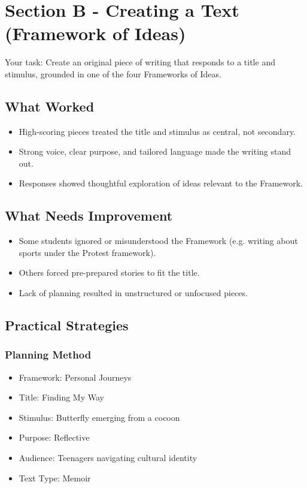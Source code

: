 \documentclass[a4paper]{article}
\begin{document}
\newpage
\section{Section B - Creating a Text (Framework of Ideas)}
Your task: Create an original piece of writing that responds to a title and stimulus, grounded in one of the four Frameworks of Ideas.

\subsection{What Worked}
\begin{itemize}
    \item High-scoring pieces treated the title and stimulus as central, not secondary.

\item Strong voice, clear purpose, and tailored language made the writing stand out.

\item Responses showed thoughtful exploration of ideas relevant to the Framework.
\end{itemize}

\subsection{What Needs Improvement}
\begin{itemize}
    \item Some students ignored or misunderstood the Framework (e.g. writing about sports under the Protest framework).

\item Others forced pre-prepared stories to fit the title.

\item Lack of planning resulted in unstructured or unfocused pieces.
\end{itemize}

\subsection{Practical Strategies}
\subsubsection{Planning Method}
\begin{itemize}
    \item Framework: Personal Journeys

\item Title: Finding My Way

\item Stimulus: Butterfly emerging from a cocoon

\item Purpose: Reflective

\item Audience: Teenagers navigating cultural identity

\item Text Type: Memoir
\end{itemize}
\end{document}
